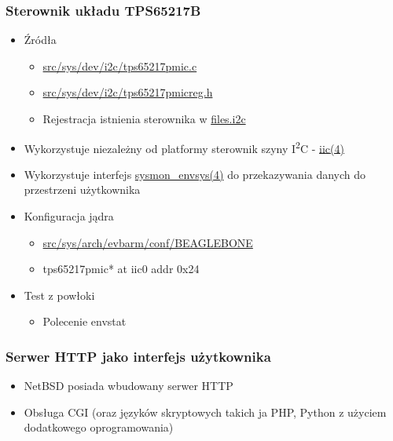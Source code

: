 \documentclass[dvipsnames,table]{beamer}
\begin{document}
\begin{frame}
\frametitle{Sterownik układu TPS65217B}
\begin{itemize}
	\item Źródła
	\begin{itemize}
		\item \href{http://nxr.netbsd.org/xref/src/sys/dev/i2c/tps65217pmic.c}{src/sys/dev/i2c/tps65217pmic.c}
		\item \href{http://nxr.netbsd.org/xref/src/sys/dev/i2c/tps65217pmicreg.h}{src/sys/dev/i2c/tps65217pmicreg.h}
		\item Rejestracja istnienia sterownika w \href{http://nxr.netbsd.org/xref/src/sys/dev/i2c/files.i2c}{files.i2c}
	\end{itemize}
	\item Wykorzystuje niezależny od platformy sterownik szyny I\textsuperscript{2}C - \href{http://netbsd.gw.com/cgi-bin/man-cgi?iic+9+NetBSD-current}{iic(4)}
	\item Wykorzystuje interfejs \href{http://netbsd.gw.com/cgi-bin/man-cgi?sysmon_envsys+9+NetBSD-current}{sysmon\_envsys(4)} do przekazywania danych do przestrzeni użytkownika
	\item Konfiguracja jądra
	\begin{itemize}
		\item \href{http://nxr.netbsd.org/xref/src/sys/arch/evbarm/conf/BEAGLEBONE}{src/sys/arch/evbarm/conf/BEAGLEBONE}
		\item tps65217pmic*	at iic0 addr 0x24
	\end{itemize}
	\item Test z powłoki
	\begin{itemize}
		\item Polecenie envstat
	\end{itemize}
\end{itemize}
\end{frame}

\begin{frame}
\frametitle{Serwer HTTP jako interfejs użytkownika}
\begin{itemize}
	\item NetBSD posiada wbudowany serwer HTTP
	\item Obsługa CGI (oraz języków skryptowych takich ja PHP, Python z użyciem dodatkowego oprogramowania)
\end{itemize}
\end{frame}
\end{document}
